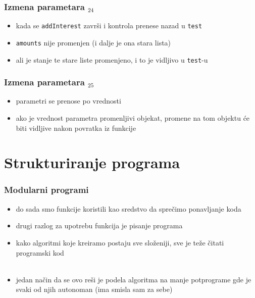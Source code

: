 \documentclass[utf8,compress]{beamer}
\begin{document}
\begin{frame}[fragile]
  \frametitle{Izmena parametara $_{24}$}
  \begin{itemize}
    \item kada se \texttt{addInterest} završi i kontrola prenese nazad u \texttt{test}
    \item \texttt{amounts} nije promenjen (i dalje je ona stara lista)
    \item ali je stanje te stare liste promenjeno, i to je vidljivo u \texttt{test}-u
  \end{itemize}
\end{frame}

\begin{frame}[fragile]
  \frametitle{Izmena parametara $_{25}$}
  \begin{itemize}
    \item parametri se  prenose po vrednosti
    \item ako je vrednost parametra promenljivi objekat, promene na tom objektu će biti vidljive nakon povratka iz funkcije
  \end{itemize}
\end{frame}

\section{Strukturiranje programa}

\begin{frame}[fragile]
  \frametitle{Modularni programi}
  \begin{itemize}
    \item do sada smo funkcije koristili kao sredstvo da sprečimo ponavljanje koda
    \item drugi razlog za upotrebu funkcija je pisanje  programa
    \item kako algoritmi koje kreiramo postaju sve složeniji, sve je teže čitati programski kod \\ \ \\
    \item jedan način da se ovo reši je podela algoritma na manje potprograme gde je svaki od njih autonoman (ima smisla sam za sebe)
  \end{itemize}
\end{frame}
\end{document}
